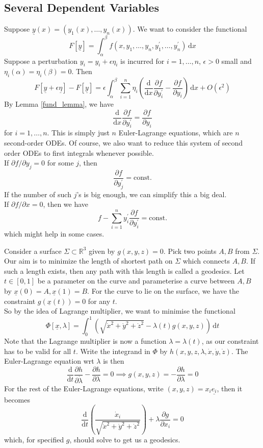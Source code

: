 \subsection{Several Dependent Variables}
Suppose $\underline{y}(x)=(y_1(x),\ldots,y_n(x))$.
We want to consider the functional
$$F[\underline{y}]=\int_\alpha^\beta f(x,y_1,\ldots,y_n,y_1^\prime,\ldots,y_n^\prime)\,\mathrm dx$$
Suppose a perturbation $y_i=y_i+\epsilon \eta_i$ is incurred for $i=1,\ldots,n$, $\epsilon>0$ small and $\eta_i(\alpha)=\eta_i(\beta)=0$.
Then
$$F[\underline{y}+\epsilon\underline{\eta}]-F[\underline{y}]=\epsilon\int_\alpha^\beta\sum_{i=1}^n\eta_i\left( \frac{\mathrm d}{\mathrm dx}\frac{\partial f}{\partial y_i^\prime}-\frac{\partial f}{\partial y_i} \right)\,\mathrm dx+O(\epsilon^2)$$
By Lemma \ref{fund_lemma}, we have
$$\frac{\mathrm d}{\mathrm dx}\frac{\partial f}{\partial y_i^\prime}=\frac{\partial f}{\partial y_i}$$
for $i=1,\ldots,n$.
This is simply just $n$ Euler-Lagrange equations, which are $n$ second-order ODEs.
Of course, we also want to reduce this system of second order ODEs to first integrals whenever possible.\\
If $\partial f/\partial y_j=0$ for some $j$, then
$$\frac{\partial f}{\partial y_j^\prime}=\text{const.}$$
If the number of such $j$'s is big enough, we can simplify this a big deal.\\
If $\partial f/\partial x=0$, then we have
$$f-\sum_{i=1}^ny_i^\prime\frac{\partial f}{\partial y_i^\prime}=\text{const.}$$
which might help in some cases.
\begin{example}
    Consider a surface $\Sigma\subset\mathbb R^3$ given by $g(x,y,z)=0$.
    Pick two points $A,B$ from $\Sigma$.
    Our aim is to minimize the length of shortest path on $\Sigma$ which connects $A,B$.
    If such a length exists, then any path with this length is called a geodesics.
    Let $t\in[0,1]$ be a parameter on the curve and parameterise a curve between $A,B$ by $\underline{x}(0)=A,\underline{x}(1)=B$.
    For the curve to lie on the surface, we have the constraint $g(\underline{x}(t))=0$ for any $t$.\\
    So by the idea of Lagrange multiplier, we want to minimise the functional
    $$\Phi[\underline{x},\lambda]=\int_0^1\left( \sqrt{\dot{x}^2+\dot{y}^2+\dot{z}^2} -\lambda(t) g(x,y,z)\right)\,\mathrm dt$$
    Note that the Lagrange multiplier is now a function $\lambda=\lambda(t)$, as our constraint has to be valid for all $t$.
    Write the integrand in $\Phi$ by $h(x,y,z,\lambda,\dot{x},\dot{y},\dot{z})$.
    The Euler-Lagrange equation wrt $\lambda$ is then
    $$\frac{\mathrm d}{\mathrm dt}\frac{\partial h}{\partial \dot{\lambda}}-\frac{\partial h}{\partial\lambda}=0\implies g(x,y,z)=-\frac{\partial h}{\partial\lambda}=0$$
    For the rest of the Euler-Lagrange equations, write $(x,y,z)=x_i\underline{e_i}$, then it becomes
    $$\frac{\mathrm d}{\mathrm dt}\left( \frac{\dot{x}_i}{\sqrt{\dot{x}^2+\dot{y}^2+\dot{z}^2}} \right)+\lambda\frac{\partial g}{\partial x_i}=0$$
    which, for specified $g$, should solve to get us a geodesics.
\end{example}
